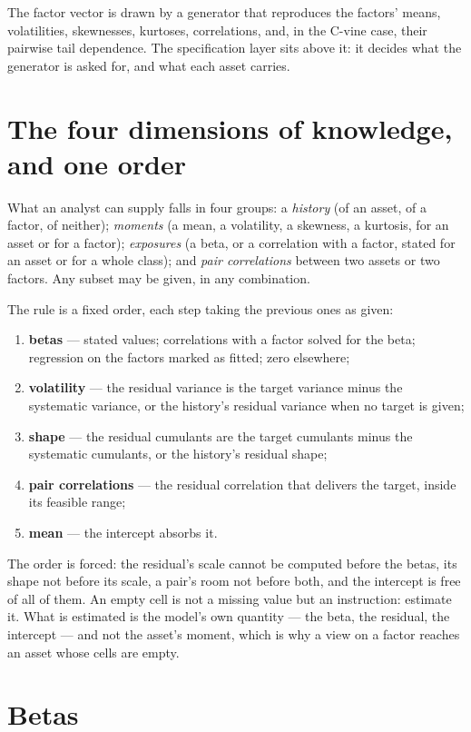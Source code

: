 \documentclass[11pt]{article}
\begin{document}
The factor vector is drawn by a generator that reproduces the factors' means,
volatilities, skewnesses, kurtoses, correlations, and, in the C-vine case,
their pairwise tail dependence. The specification layer sits above it: it
decides what the generator is asked for, and what each asset carries.

\section{The four dimensions of knowledge, and one order}

What an analyst can supply falls in four groups: a \emph{history} (of an asset,
of a factor, of neither); \emph{moments} (a mean, a volatility, a skewness, a
kurtosis, for an asset or for a factor); \emph{exposures} (a beta, or a
correlation with a factor, stated for an asset or for a whole class); and
\emph{pair correlations} between two assets or two factors. Any subset may be
given, in any combination.

The rule is a fixed order, each step taking the previous ones as given:
\begin{enumerate}
  \item \textbf{betas} --- stated values; correlations with a factor solved for
        the beta; regression on the factors marked as fitted; zero elsewhere;
  \item \textbf{volatility} --- the residual variance is the target variance
        minus the systematic variance, or the history's residual variance when
        no target is given;
  \item \textbf{shape} --- the residual cumulants are the target cumulants
        minus the systematic cumulants, or the history's residual shape;
  \item \textbf{pair correlations} --- the residual correlation that delivers
        the target, inside its feasible range;
  \item \textbf{mean} --- the intercept absorbs it.
\end{enumerate}
The order is forced: the residual's scale cannot be computed before the betas,
its shape not before its scale, a pair's room not before both, and the
intercept is free of all of them. An empty cell is not a missing value but an
instruction: estimate it. What is estimated is the model's own quantity --- the
beta, the residual, the intercept --- and not the asset's moment, which is why a
view on a factor reaches an asset whose cells are empty.

\section{Betas}
\end{document}
